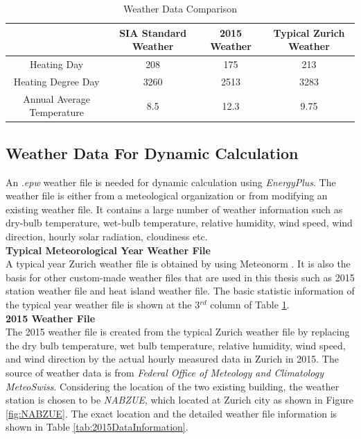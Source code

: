 \documentclass[a4paper, oneside]{discothesis}
\begin{document}
				\begin{table}[htbp]
				  \centering
				\caption{Weather Data Comparison}
				    \begin{tabular}{|c|c|c|c|}
				    \toprule
				         & \multicolumn{1}{c}{SIA Standard Weather} & 2015 Weather & Typical Zurich Weather\\
				    \midrule
				    Heating Day & 208  & 175 & 213\\
				    \midrule
				    Heating Degree Day & 3260 & 2513 & 3283\\
				    \midrule
				    Annual Average Temperature & 8.5  & 12.3 & 9.75\\
				    \bottomrule
				    \end{tabular}%
				  \label{tab:StaticWeatherCompare}%
				\end{table}%


			\subsection{Weather Data For Dynamic Calculation}
				An .\textit{epw} weather file is needed for dynamic calculation using \textit{EnergyPlus}. The weather file is either from a meteological organization or from modifying an existing weather file. It contains a large number of weather information such as dry-bulb temperature, wet-bulb temperature, relative humidity, wind speed, wind direction, hourly solar radiation, cloudiness etc.\\

			\textbf{Typical Meteorological Year Weather File}\\
				A typical year Zurich weather file is obtained by using Meteonorm \cite{GeorgeThesis}. It is also the basis for other custom-made weather files that are used in this thesis such as 2015 station weather file and heat island weather file. The basic statistic information of the typical year weather file is shown at the 3$^{rd}$ column of Table \ref{tab:StaticWeatherCompare}. \\

			\textbf{2015 Weather File}\\
				The 2015 weather file is created from the typical Zurich weather file by replacing the dry bulb temperature, wet bulb temperature, relative humidity, wind speed, and wind direction by the actual hourly measured data in Zurich in 2015. The source of weather data is from \textit{Federal Office of Meteology and Climatology MeteoSwiss}. Considering the location of the two existing building, the weather station is chosen to be \textit{NABZUE}, which located at Zurich city as shown in Figure \ref{fig:NABZUE}. The exact location and the detailed weather file information is shown in Table \ref{tab:2015DataInformation}.
\end{document}
